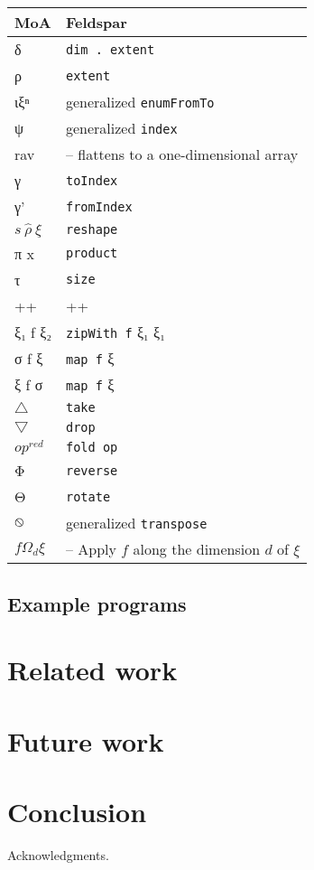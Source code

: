 \documentclass{sigplanconf}
\begin{document}
\begin{tabular}{|@{}l|l@{}|}
\hline
MoA & Feldspar
\\
\hline
δ & \verb!dim . extent!
\\
ρ & \verb!extent!
\\
ιξⁿ & generalized \verb!enumFromTo!
\\
ψ & generalized \verb!index!
\\
rav & -- flattens to a one-dimensional array
\\
γ & \verb!toIndex!
\\
γ' & \verb!fromIndex!
\\
$s \: \hat{ρ} \: ξ$ & \verb!reshape!
\\
π x & \verb!product!
\\
τ & \verb!size!
\\
++ & ++
\\
ξ₁ f ξ₂ & \verb!zipWith f! ξ₁ ξ₁
\\
σ f ξ & \verb!map f! ξ
\\
ξ f σ & \verb!map f! ξ
\\
$\bigtriangleup$ & \verb!take!
\\
$\bigtriangledown$ & \verb!drop!
\\
$op^{red}$ & \verb!fold op!
\\
Φ & \verb!reverse!
\\
Θ & \verb!rotate!
\\
$\varobslash$ & generalized \verb!transpose!
\\
$f Ω_d ξ$ & -- Apply $f$ along the dimension $d$ of $ξ$
\\
\hline
\end{tabular}

\subsection{Example programs}

\section{Related work}

\section{Future work}

\section{Conclusion}

\acks

Acknowledgments.








\end{document}
